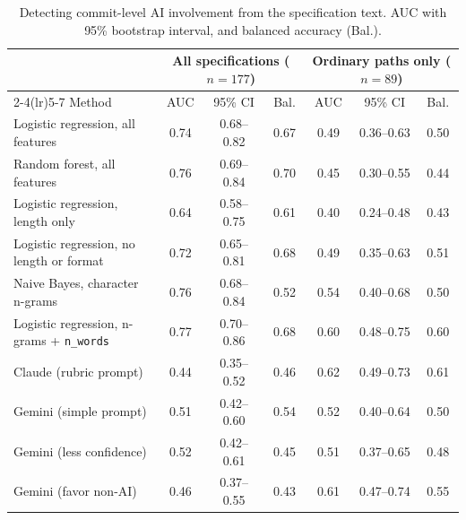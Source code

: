 \documentclass{article}
\begin{document}
\begin{table}[ht]
\centering
\small
\caption{Detecting commit-level AI involvement from the specification text. AUC with 95\% bootstrap interval, and balanced accuracy (Bal.).}
\label{tab:provenance-cv}
\begin{tabular}{lcccccc}
\toprule
& \multicolumn{3}{c}{All specifications ($n=177$)} & \multicolumn{3}{c}{Ordinary paths only ($n=89$)} \\
\cmidrule(lr){2-4}\cmidrule(lr){5-7}
Method & AUC & 95\% CI & Bal. & AUC & 95\% CI & Bal. \\
\midrule
Logistic regression, all features & 0.74 & 0.68--0.82 & 0.67 & 0.49 & 0.36--0.63 & 0.50 \\
Random forest, all features & 0.76 & 0.69--0.84 & 0.70 & 0.45 & 0.30--0.55 & 0.44 \\
Logistic regression, length only & 0.64 & 0.58--0.75 & 0.61 & 0.40 & 0.24--0.48 & 0.43 \\
Logistic regression, no length or format & 0.72 & 0.65--0.81 & 0.68 & 0.49 & 0.35--0.63 & 0.51 \\
Naive Bayes, character n-grams & 0.76 & 0.68--0.84 & 0.52 & 0.54 & 0.40--0.68 & 0.50 \\
Logistic regression, n-grams + \texttt{n\_words} & 0.77 & 0.70--0.86 & 0.68 & 0.60 & 0.48--0.75 & 0.60 \\
\midrule
Claude (rubric prompt) & 0.44 & 0.35--0.52 & 0.46 & 0.62 & 0.49--0.73 & 0.61 \\
Gemini (simple prompt) & 0.51 & 0.42--0.60 & 0.54 & 0.52 & 0.40--0.64 & 0.50 \\
Gemini (less confidence) & 0.52 & 0.42--0.61 & 0.45 & 0.51 & 0.37--0.65 & 0.48 \\
Gemini (favor non-AI) & 0.46 & 0.37--0.55 & 0.43 & 0.61 & 0.47--0.74 & 0.55 \\
\bottomrule
\end{tabular}
\end{table}
\end{document}
